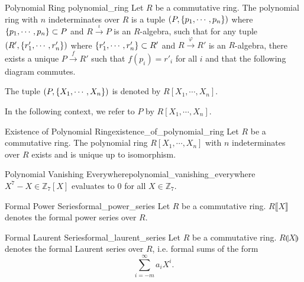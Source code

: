 \documentclass{article}
\begin{document}
\begin{definition}{Polynomial Ring }{polynomial_ring}
    Let $R$ be a commutative ring.
    The polynomial ring with $n$ indeterminates over $R$ is a tuple $(P,\qty{p_1,\cdots,p_n})$ where $\qty{p_1,\cdots,p_n}\subset P$ and $R\xrightarrow{\iota} P$ is an $R$-algebra,
    such that for any tuple $(R',\qty{r'_1,\cdots,r'_n})$ where $\qty{r'_1,\cdots,r'_n}\subset R'$ and $R\xrightarrow{\varphi} R'$ is an $R$-algebra, there exists a unique $P\xrightarrow{f} R'$ such that $f(p_i) = r'_i$ for all $i$ and that the following diagram commutes.
    \begin{center}
    \end{center}
    The tuple $(P,\qty{X_1,\cdots,X_n})$ is denoted by $R[X_1,\cdots,X_n]$.
\end{definition}

In the following context, we refer to $P$ by $R[X_1,\cdots,X_n]$.

\begin{proposition}{Existence of Polynomial Ring}{existence_of_polynomial_ring}
    Let $R$ be a commutative ring.
    The polynomial ring $R[X_1,\cdots,X_n]$ with $n$ indeterminates over $R$ exists and is unique up to isomorphism.
\end{proposition}

\begin{example}{Polynomial Vanishing Everywhere}{polynomial_vanishing_everywhere}
    $X^7-X\in \mathbb{Z}_7[X]$ evaluates to $0$ for all $X\in \mathbb{Z}_7$.
\end{example}

\begin{definition}{Formal Power Series}{formal_power_series}
    Let $R$ be a commutative ring.
    $R\llbracket X \rrbracket$ denotes the formal power series over $R$.
\end{definition}

\begin{definition}{Formal Laurent Series}{formal_laurent_series}
    Let $R$ be a commutative ring.
    $R\llparenthesis X \rrparenthesis$ denotes the formal Laurent series over $R$, i.e. formal sums of the form
    \[ \sum_{i=-m}^\infty a_i X^i. \]
\end{definition}
\end{document}
